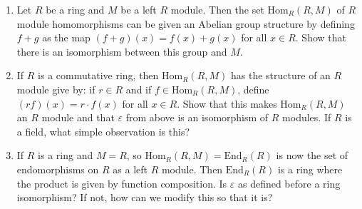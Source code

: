 \documentclass[crop=false,class=article]{standalone}                       %
\begin{document}
        \begin{problem}
            \par\hfill\par
            \begin{enumerate}
                \item   Let $R$ be a ring and $M$ be a left $R$ module.
                        Then the set $\textrm{Hom}_{R}(R,M)$ of $R$ module
                        homomorphisms can be given an Abelian group
                        structure by defining $f+g$ as the map
                        $(f+g)(x)=f(x)+g(x)$ for all $x\in{R}$. Show that
                        there is an isomorphism between this group and $M$.
                \item   If $R$ is a commutative ring, then
                        $\textrm{Hom}_{R}(R,M)$ has the structure of an
                        $R$ module give by: if $r\in{R}$ and if
                        $f\in\textrm{Hom}_{R}(R,M)$, define
                        $(rf)(x)=r\cdot{f(x)}$ for all $x\in{R}$. Show that
                        this makes $\textrm{Hom}_{R}(R,M)$ an $R$ module
                        and that $\varepsilon$ from above is an isomorphism
                        of $R$ modules. If $R$ is a field, what simple
                        observation is this?
                \item   If $R$ is a ring and $M=R$, so
                        $\textrm{Hom}_{R}(R,M)=\textrm{End}_{R}(R)$ is
                        now the set of endomorphisms on $R$ as a left
                        $R$ module. Then $\textrm{End}_{R}(R)$ is a ring
                        where the product is given by function
                        composition. Is $\varepsilon$ as defined before
                        a ring isomorphism? If not, how can we modify this
                        so that it is?
            \end{enumerate}
        \end{problem}
\end{document}
